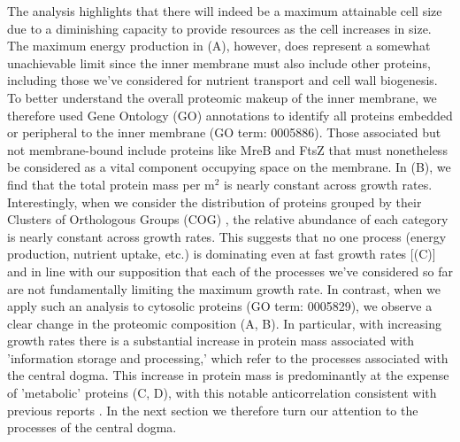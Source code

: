 The analysis highlights that there will indeed be a maximum attainable cell size
due to a diminishing capacity to provide resources as the cell increases in
size. The maximum energy production in (A), however, does
represent a somewhat unachievable limit since the inner membrane must also
include other proteins, including those we've considered for nutrient transport
and cell wall biogenesis. To better understand the overall proteomic makeup of
the inner membrane, we therefore used Gene Ontology (GO) annotations
\citep{ashburner2000, thegeneOntologyconsortium2018} to identify all proteins
embedded or peripheral to the inner membrane (GO term: 0005886). Those
associated but not membrane-bound include proteins like MreB and FtsZ that must
nonetheless be considered as a vital component occupying space on the membrane.
In (B), we find that the total protein mass per \textmu
m$^2$ is nearly constant across growth rates. Interestingly, when we consider
the distribution of proteins grouped by their Clusters of Orthologous Groups
(COG) \citep{tatusov2000}, the relative abundance of each category is nearly
constant across growth rates. This suggests that no one process (energy
production, nutrient uptake, etc.) is dominating even at fast growth rates
[(C)] and in line with our supposition that each of the
processes we've considered so far are not fundamentally limiting the maximum
growth rate. In contrast, when we apply such an analysis to cytosolic proteins
(GO term: 0005829), we observe a clear change in the proteomic composition
(A, B). In particular, with increasing
growth rates there is a substantial increase in protein mass associated with
'information storage and processing,' which refer to the processes associated
with the central dogma. This increase in protein mass is predominantly at the
expense of 'metabolic' proteins  (C, D),
with this notable anticorrelation consistent with previous reports
\citep{schmidt2016, scott2010, zhu2019}. In the next section we therefore turn
our attention to the processes of the central dogma.

